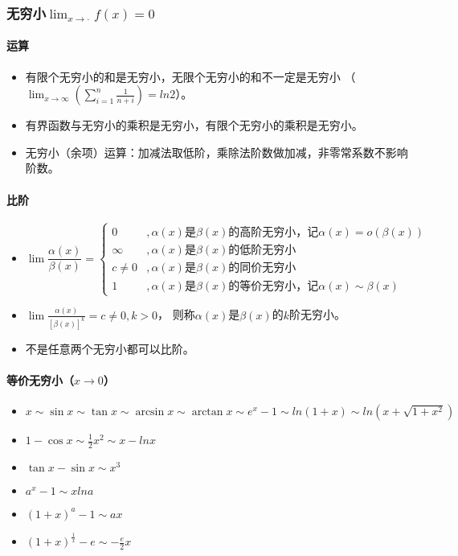 \documentclass[
12pt, %
a4paper, 
oneside, %
headinclude,footinclude, %
]{scrartcl}
\begin{document}
\subsubsection{无穷小$ \lim_{x \to \cdot} f(x) = 0 $}
\paragraph{运算}
\begin{itemize}
\item 有限个无穷小的和是无穷小，无限个无穷小的和不一定是无穷小
（$ \lim_{x \to \infty}(\sum_{i = 1}^{n}  \frac{1}{n + i}) = ln 2 $）。
\item 有界函数与无穷小的乘积是无穷小，有限个无穷小的乘积是无穷小。
\item 无穷小（余项）运算：加减法取低阶，乘除法阶数做加减，非零常系数不影响阶数。
\end{itemize}
\paragraph{比阶}
\begin{itemize}
\item 
$$
\lim \frac{\alpha(x)}{\beta(x)}=
\begin{cases}
0 &, \alpha(x) \text{是} \beta(x) \text{的高阶无穷小，记} \alpha(x) = o(\beta(x)) \\
\infty &, \alpha(x) \text{是} \beta(x) \text{的低阶无穷小} \\
c \neq 0 &, \alpha(x) \text{是} \beta(x) \text{的同价无穷小} \\
1 &, \alpha(x) \text{是} \beta(x) \text{的等价无穷小，记} \alpha(x) \sim \beta(x)
\end{cases}
$$
\item $ \lim \frac{\alpha(x)}{[\beta(x)]^k} = c \neq 0, k > 0 $，
则称$ \alpha(x) $是$ \beta(x) $的$ k $阶无穷小。
\item 不是任意两个无穷小都可以比阶。
\end{itemize}
\paragraph{等价无穷小（$ x \rightarrow 0 $）}
\begin{itemize}
\item $ x \sim \sin x \sim \tan x \sim \arcsin x \sim \arctan x \sim e^x -1 \sim ln(1 + x) \sim ln(x + \sqrt{1 + x^2}) $
\item $ 1 - \cos x \sim \frac{1}{2}x^2 \sim x - lnx $
\item $ \tan x - \sin x \sim x^3 $
\item $ a^x -1 \sim x ln a $
\item $ (1 + x)^a - 1 \sim ax $
\item $ (1 + x)^{\frac{1}{x}} - e \sim -\frac{e}{2}x $
\end{itemize}
\end{document}
